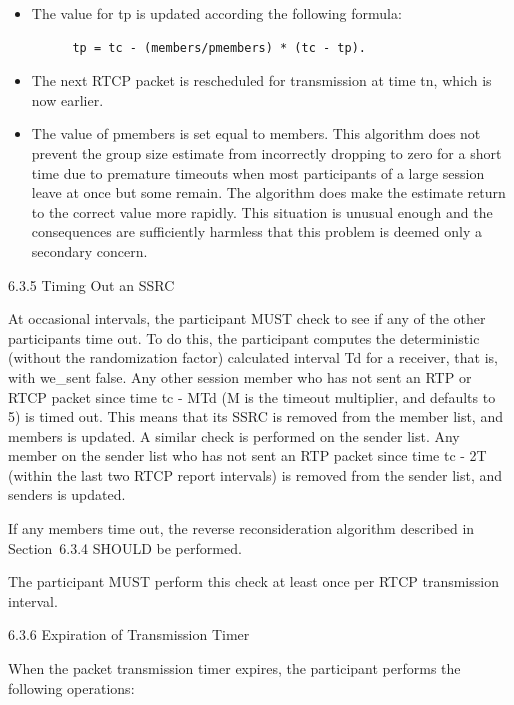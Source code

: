 \documentclass{article}
\begin{document}
\begin{itemize}
\item The value for tp is updated according the following formula:
\end{itemize}
\begin{verbatim}
         tp = tc - (members/pmembers) * (tc - tp).
\end{verbatim}

\begin{itemize}
\item The next RTCP packet is rescheduled for transmission at time tn, which is now earlier.
\item The value of pmembers is set equal to members.
This algorithm does not prevent the group size estimate from incorrectly dropping to zero for a short time due to premature timeouts when most participants of a large session leave at once but some remain.  The algorithm does make the estimate return to the correct value more rapidly.  This situation is unusual enough and the consequences are sufficiently harmless that this problem is deemed only a secondary concern.

\end{itemize}
6.3.5 Timing Out an SSRC

At occasional intervals, the participant MUST check to see if any of the other participants time out.  To do this, the participant computes the deterministic (without the randomization factor) calculated interval Td for a receiver, that is, with we\_sent false. Any other session member who has not sent an RTP or RTCP packet since time tc - MTd (M is the timeout multiplier, and defaults to 5) is timed out.  This means that its SSRC is removed from the member list, and members is updated.  A similar check is performed on the sender list.  Any member on the sender list who has not sent an RTP packet since time tc - 2T (within the last two RTCP report intervals) is removed from the sender list, and senders is updated.

If any members time out, the reverse reconsideration algorithm described in Section~6.3.4 SHOULD be performed.

The participant MUST perform this check at least once per RTCP transmission interval.

6.3.6 Expiration of Transmission Timer

When the packet transmission timer expires, the participant performs the following operations:
\end{document}
